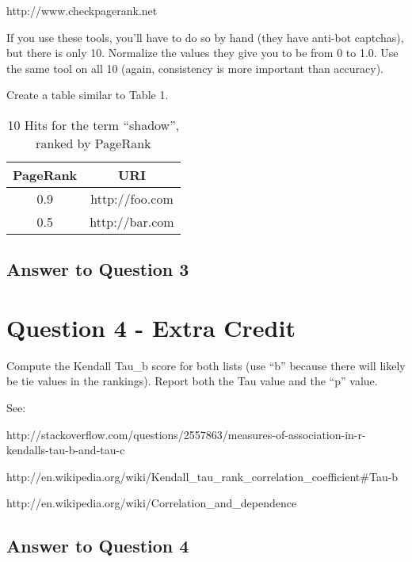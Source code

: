 \documentclass{article}
\begin{document}
http://www.checkpagerank.net

If you use these tools, you'll have to do so by hand (they have anti-bot captchas), but there is only 10. Normalize the values they give you to be from 0 to 1.0. Use the same tool on all 10 (again, consistency is more important than accuracy).

Create a table similar to Table 1.

\begin{table}[!h]
\centering
\caption{10 Hits for the term ``shadow'', ranked by PageRank}
\begin{tabular}{c c}
\hline
PageRank & URI \\
\hline
\hline
0.9 & http://foo.com \\
0.5 & http://bar.com \\
\hline
\end{tabular}
\end{table}

\subsection*{Answer to Question 3}

\section*{Question 4 - Extra Credit}

Compute the Kendall Tau\_b score for both lists (use ``b'' because there will likely be tie values in the rankings). Report both the Tau value and the ``p'' value.

See:

http://stackoverflow.com/questions/2557863/measures-of-association-in-r-kendalls-tau-b-and-tau-c

http://en.wikipedia.org/wiki/Kendall\_tau\_rank\_correlation\_coefficient\#Tau-b

http://en.wikipedia.org/wiki/Correlation\_and\_dependence

\subsection*{Answer to Question 4}
\end{document}
